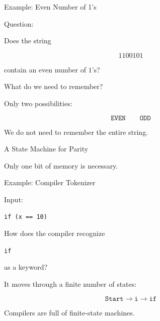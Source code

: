 \documentclass[10pt,aspectratio=169]{beamer}
\begin{document}
\begin{frame}{Example: Even Number of 1's}

Question:

Does the string

\[
1100101
\]

contain an even number of \(1\)'s?

\pause

What do we need to remember?

\pause

Only two possibilities:

\[
\texttt{EVEN}
\qquad
\texttt{ODD}
\]

\vspace{1em}

We do not need to remember the entire string.

\end{frame}

\begin{frame}{A State Machine for Parity}

\begin{center}


\end{center}

Only one bit of memory is necessary.

\end{frame}

\begin{frame}[fragile]{Example: Compiler Tokenizer}

Input:

\begin{lstlisting}
if (x == 10)
\end{lstlisting}

\vspace{1em}

How does the compiler recognize

\begin{center}
\texttt{if}
\end{center}

as a keyword?

\pause

It moves through a finite number of states:

\[
\texttt{Start}
\rightarrow
\texttt{i}
\rightarrow
\texttt{if}
\]

\pause

Compilers are full of finite-state machines.

\end{frame}
\end{document}
